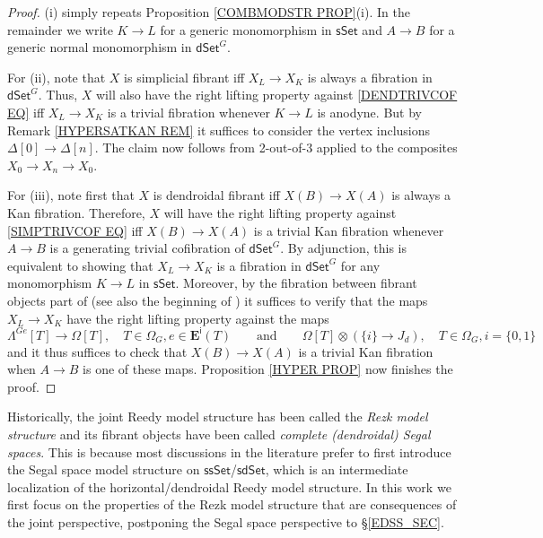 \documentclass[a4paper,10pt
,draft
]{article}%
\begin{document}
\begin{proof}
(i) simply repeats Proposition \ref{COMBMODSTR PROP}(i). In the remainder we write $K \to L$ for a generic monomorphism in 
$\mathsf{sSet}$
and $A \to B$ for a generic normal monomorphism in $\mathsf{dSet}^G$.

For (ii), note that $X$ is simplicial fibrant iff 
$X_L \to X_K$ is always a fibration in $\mathsf{dSet}^G$. 
Thus, $X$ will also have the right lifting property against \eqref{DENDTRIVCOF EQ} iff 
$X_L \to X_K$ is a trivial fibration whenever $K \to L$ is anodyne. But by Remark \ref{HYPERSATKAN REM}
it suffices to consider the vertex inclusions $\Delta[0] \to \Delta[n]$.
The claim now follows from 2-out-of-3 applied to the composites $X_0 \to X_n \to X_0$.

For (iii), note first that $X$ is dendroidal fibrant iff $X(B) \to X(A)$ is always a Kan fibration.
Therefore, $X$ will have the right lifting property against \eqref{SIMPTRIVCOF EQ} iff 
$X(B) \to X(A)$ is a trivial Kan fibration whenever $A\to B$ is a generating trivial cofibration of $\mathsf{dSet}^G$.
By adjunction, this is equivalent to showing that
$X_L \to X_K$ is a fibration in $\mathsf{dSet}^G$ for any monomorphism $K \to L$ in $\mathsf{sSet}$. Moreover, by the fibration between fibrant objects part of \cite[Prop. 8.8]{Per18}
(see also the beginning of \cite[\S 8.1]{Per18})
it suffices to verify that the maps $X_L \to X_K$ have the right lifting property against the maps
\[
	\Lambda^{G e} [T] \to \Omega[T],
	\quad
	T \in \Omega_G, e \in \boldsymbol{E}^{\mathsf{i}}(T)
\qquad
\text{and}
\qquad
	\Omega[T] \otimes \left( \{i\} \to J_d\right),
	\quad
	T \in \Omega_G, i = \{0,1\}
\]
and it thus suffices to check that $X(B) \to X(A)$ is a trivial Kan fibration when $A\to B$ is one of these maps.
Proposition \ref{HYPER PROP} now finishes the proof.
\end{proof}

\begin{remark}
Historically, the joint Reedy model structure has been called the \textit{Rezk model structure} and its fibrant objects have been called 
\textit{complete (dendroidal) Segal spaces}.
This is because most discussions in the literature 
\cite{Rez01,CM13a}
prefer to first introduce the Segal space model structure on
$\mathsf{ssSet}$/$\mathsf{sdSet}$, which is an intermediate localization of the 
horizontal/dendroidal Reedy model structure.
In this work we first focus on the properties of the Rezk model structure that are consequences of the joint perspective, 
postponing the Segal space perspective to \S \ref{EDSS_SEC}.
\end{remark}
\end{document}
